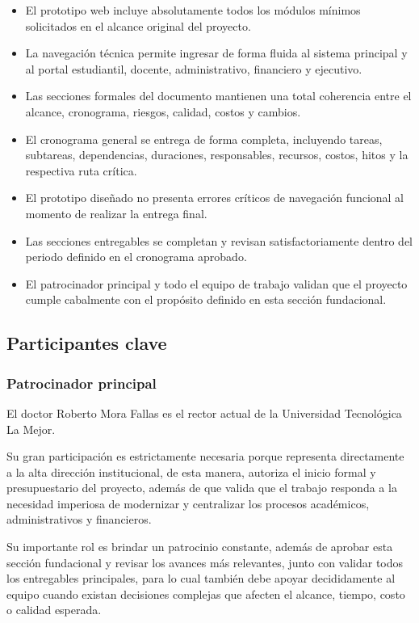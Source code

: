 \documentclass[11pt,spanish]{article}
\begin{document}
\begin{itemize}
    \item El prototipo web incluye absolutamente todos los módulos mínimos solicitados en el alcance original del proyecto.
    \item La navegación técnica permite ingresar de forma fluida al sistema principal y al portal estudiantil, docente, administrativo, financiero y ejecutivo.
    \item Las secciones formales del documento mantienen una total coherencia entre el alcance, cronograma, riesgos, calidad, costos y cambios.
    \item El cronograma general se entrega de forma completa, incluyendo tareas, subtareas, dependencias, duraciones, responsables, recursos, costos, hitos y la respectiva ruta crítica.
    \item El prototipo diseñado no presenta errores críticos de navegación funcional al momento de realizar la entrega final.
    \item Las secciones entregables se completan y revisan satisfactoriamente dentro del periodo definido en el cronograma aprobado.
    \item El patrocinador principal y todo el equipo de trabajo validan que el proyecto cumple cabalmente con el propósito definido en esta sección fundacional.
\end{itemize}

\subsection{Participantes clave}

\subsubsection{Patrocinador principal}

El doctor Roberto Mora Fallas es el rector actual de la Universidad Tecnológica La Mejor.

Su gran participación es estrictamente necesaria porque representa directamente a la alta dirección institucional, de esta manera, autoriza el inicio formal y presupuestario del proyecto, además de que valida que el trabajo responda a la necesidad imperiosa de modernizar y centralizar los procesos académicos, administrativos y financieros.

Su importante rol es brindar un patrocinio constante, además de aprobar esta sección fundacional y revisar los avances más relevantes, junto con validar todos los entregables principales, para lo cual también debe apoyar decididamente al equipo cuando existan decisiones complejas que afecten el alcance, tiempo, costo o calidad esperada.
\end{document}
